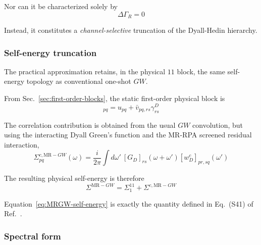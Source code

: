 \documentclass[aip,jcp,reprint,noshowkeys,superscriptaddress]{revtex4-1}
\begin{document}
Nor can it be characterized solely by
\begin{equation}
  \Delta\Gamma_R=0
\end{equation}

Instead, it constitutes a \emph{channel-selective} truncation of the
Dyall-Hedin hierarchy.


\subsubsection{Self-energy truncation}

The practical approximation retains, in the physical $11$ block, the
same self-energy topology as conventional one-shot $GW$.

From Sec.~\ref{sec:first-order-blocks}, the static first-order physical block is
\begin{equation}
  [\Sigma_1^{11}]_{pq}
  =
  u_{pq}
  +
  \bar v_{pq,rs}
  \gamma_{rs}^D
  \label{eq:sigma11-static-task3}
\end{equation}

The correlation contribution is obtained from the usual $GW$
convolution, but using the interacting Dyall Green's function and the
MR-RPA screened residual interaction,
\begin{equation}
  \Sigma_{pq}^{c,\mathrm{MR-}GW}(\omega)
  =
  \frac{i}{2\pi}
  \int d\omega'
  \
  [G_D]_{rs}(\omega+\omega')
  [w_D^c]_{pr,sq}(\omega')
  \label{eq:MRGW-convolution}
\end{equation}

The resulting physical self-energy is therefore
\begin{equation}
  \Sigma^{\mathrm{MR-}GW}
  =
  \Sigma_1^{11}
  +
  \Sigma^{c,\mathrm{MR-}GW}
  \label{eq:MRGW-self-energy}
\end{equation}

Equation~\eqref{eq:MRGW-self-energy} is exactly the quantity defined in
Eq.~(S41) of Ref.~\cite{WangFangLi2026}.


\subsubsection{Spectral form}
\end{document}
